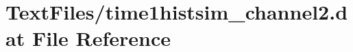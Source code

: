 \hypertarget{TextFiles_2time1histsim__channel2_8dat}{}\section{Text\+Files/time1histsim\+\_\+channel2.dat File Reference}
\label{TextFiles_2time1histsim__channel2_8dat}
